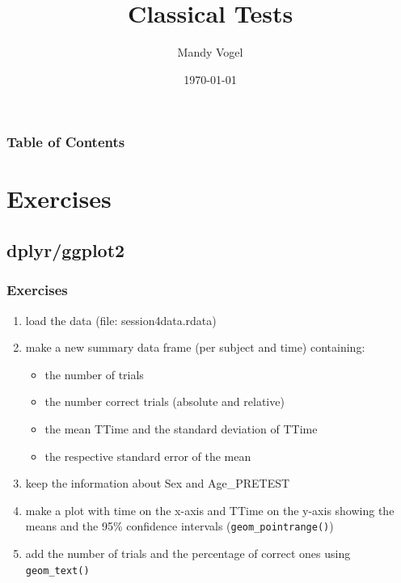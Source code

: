\documentclass[xcolor={table}]{beamer}
\begin{document}
\title{Classical Tests}   
\author{Mandy Vogel} 
\date{\today}

\begin{frame}
\titlepage
\end{frame}

\begin{frame}
\frametitle{Table of Contents}\tableofcontents
\end{frame}


\section{Exercises}
\subsection{dplyr/ggplot2}
\begin{frame}\frametitle{Exercises} 
  \begin{enumerate}
  \item load the data (file: session4data.rdata)
  \item make a new summary data frame (per subject and time) containing:
    \begin{itemize}
    \item the number of trials
    \item the number correct trials (absolute and relative)
    \item the mean TTime and the standard deviation of TTime
    \item the respective standard error of the mean
    \end{itemize}
  \item keep the information about Sex and Age\_PRETEST
  \item make a plot with time on the x-axis and TTime on the y-axis showing the means and the 95\% confidence intervals (\texttt{geom\_pointrange()})
  \item add the number of trials and the percentage of correct ones using \texttt{geom\_text()}
  \end{enumerate}
\end{frame}
\end{document}
